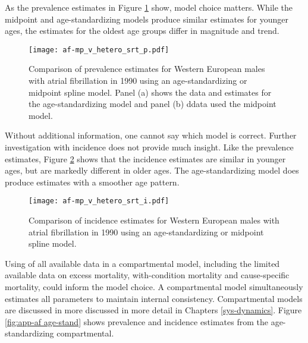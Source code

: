 As the prevalence estimates in Figure \ref{fig:app-af srt p} show, model 
choice matters.  While the midpoint and age-standardizing models produce 
similar estimates for younger ages, the estimates for the oldest age groups 
differ in magnitude and trend.

    \begin{figure}[h]
        \begin{center}
            \texttt{[image: af-mp\_v\_hetero\_srt\_p.pdf]}
            \caption{Comparison of prevalence estimates for Western European 
              males with atrial fibrillation in 1990 using an age-standardizing
              or midpoint spline model.  Panel (a) shows the data and 
              estimates for the age-standardizing model and panel (b)
              ddata used the midpoint model.}
            \label{fig:app-af srt p}
        \end{center}
    \end{figure}

Without additional information, one cannot say which model is correct.  
Further investigation with incidence does not provide much insight.  Like 
the prevalence estimates, Figure \ref{fig:app-af srt i} shows that the 
incidence estimates are similar in younger ages, but are markedly different 
in older ages.  The age-standardizing model does produce estimates with a 
smoother age pattern.
    
    \begin{figure}[h]
        \begin{center}
            \texttt{[image: af-mp\_v\_hetero\_srt\_i.pdf]}
            \caption{Comparison of incidence estimates for Western European
              males with atrial fibrillation in 1990 using an age-standardizing
              or midpoint spline model.}
            \label{fig:app-af srt i}
        \end{center}
    \end{figure}
    
Using of all available data in a compartmental model, including the 
limited available data on excess mortality, with-condition mortality 
and cause-specific mortality, could inform the model choice.  
A compartmental model simultaneously estimates all parameters to 
maintain internal consistency.  Compartmental models are discussed 
in more discussed in more detail in Chapters \ref{sys-dynamics}.  
Figure \ref{fig:app-af age-stand} shows prevalence and incidence estimates 
from the age-standardizing compartmental.

